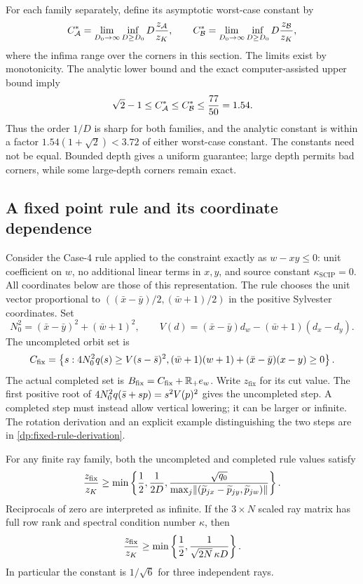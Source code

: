 For each family separately, define its asymptotic worst-case constant by
\[
 C_{\mathcal A}^*=\lim_{D_0\to\infty}\inf_{D\ge D_0}
             D\frac{z_{\mathcal A}}{z_K},\qquad
 C_{\mathcal B}^*=\lim_{D_0\to\infty}\inf_{D\ge D_0}
             D\frac{z_{\mathcal B}}{z_K},
\]
where the infima range over the corners in this section. The limits exist
by monotonicity. The analytic lower bound and the exact computer-assisted
upper bound imply
\[
 \sqrt2-1\le C_{\mathcal A}^*\le C_{\mathcal B}^*\le\frac{77}{50}=1.54.
\]
Thus the order $1/D$ is sharp for both families, and the analytic constant
is within a factor $1.54(1+\sqrt2)<3.72$ of either worst-case constant.
The constants need not be equal. Bounded depth gives a uniform guarantee;
large depth permits bad corners, while some large-depth corners remain exact.

\subsection{A fixed point rule and its coordinate dependence}

Consider the Case-4 rule applied to the constraint exactly as
$w-xy\le0$: unit coefficient on $w$, no additional linear terms in $x,y$,
and source constant $\kappa_{\mathrm{SCIP}}=0$. All coordinates below are
those of this representation. The rule chooses the unit vector proportional
to $((\bar x-\bar y)/2,(\bar w+1)/2)$ in the positive Sylvester coordinates.
Set
\[
 N_0^2=(\bar x-\bar y)^2+(\bar w+1)^2,\qquad
 V(d)=(\bar x-\bar y)d_w-(\bar w+1)(d_x-d_y).
\]
The uncompleted orbit set is
\begin{equation}\label{dp:fixed-rule-set}
 C_{\mathrm{fix}}=
 \left\{s:4N_0^2q(s)\ge V(s-\bar s)^2,
 (\bar w+1)(w+1)+(\bar x-\bar y)(x-y)\ge0\right\}.
\end{equation}
The actual completed set is $B_{\mathrm{fix}}=C_{\mathrm{fix}}+\mathbb R_+e_w$.
Write $z_{\mathrm{fix}}$ for its cut value. The first positive root of
$4N_0^2q(\bar s+sp)=s^2V(p)^2$ gives the uncompleted step. A completed
step must instead allow vertical lowering; it can be larger or infinite.
The rotation derivation and an explicit example distinguishing the two
steps are in \cref{dp:fixed-rule-derivation}.

\begin{theorem}\label{dp:fixed-rule-bound}
For any finite ray family, both the uncompleted and completed rule values
satisfy
\[
 \frac{z_{\mathrm{fix}}}{z_K}\ge
 \min\left\{\frac12,\frac1{2D},
 \frac{\sqrt{q_0}}{\max_j\lVert(\widetilde p_{jx}-\widetilde p_{jy},
                                  \widetilde p_{jw})\rVert}\right\}.
\]
Reciprocals of zero are interpreted as infinite. If the $3\times N$ scaled
ray matrix has full row rank and spectral condition number $\kappa$, then
\[
 \frac{z_{\mathrm{fix}}}{z_K}\ge
 \min\left\{\frac12,\frac1{\sqrt{2N}\,\kappa D}\right\}.
\]
In particular the constant is $1/\sqrt6$ for three independent rays.
\end{theorem}

